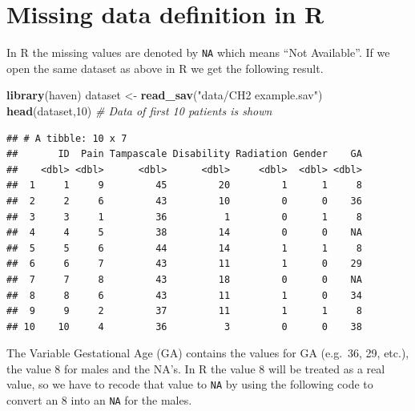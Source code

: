 \documentclass[
]{book}
\newenvironment{Shaded}{\begin{snugshade}}{\end{snugshade}}
\newcommand{\CommentTok}[1]{\textcolor[rgb]{0.56,0.35,0.01}{\textit{#1}}}
\newcommand{\DecValTok}[1]{\textcolor[rgb]{0.00,0.00,0.81}{#1}}
\newcommand{\KeywordTok}[1]{\textcolor[rgb]{0.13,0.29,0.53}{\textbf{#1}}}
\newcommand{\NormalTok}[1]{#1}
\newcommand{\OperatorTok}[1]{\textcolor[rgb]{0.81,0.36,0.00}{\textbf{#1}}}
\newcommand{\OtherTok}[1]{\textcolor[rgb]{0.56,0.35,0.01}{#1}}
\newcommand{\StringTok}[1]{\textcolor[rgb]{0.31,0.60,0.02}{#1}}
\begin{document}
\hypertarget{missing-data-definition-in-r}{%
\section{Missing data definition in
R}\label{missing-data-definition-in-r}}

In R the missing values are denoted by \texttt{NA} which means ``Not
Available''. If we open the same dataset as above in R we get the
following result.

\begin{Shaded}
\begin{Highlighting}[]
\KeywordTok{library}\NormalTok{(haven)}
\NormalTok{dataset <-}\StringTok{ }\KeywordTok{read_sav}\NormalTok{(}\StringTok{"data/CH2 example.sav"}\NormalTok{)}
\KeywordTok{head}\NormalTok{(dataset,}\DecValTok{10}\NormalTok{) }\CommentTok{# Data of first 10 patients is shown}
\end{Highlighting}
\end{Shaded}

\begin{verbatim}
## # A tibble: 10 x 7
##       ID  Pain Tampascale Disability Radiation Gender    GA
##    <dbl> <dbl>      <dbl>      <dbl>     <dbl>  <dbl> <dbl>
##  1     1     9         45         20         1      1     8
##  2     2     6         43         10         0      0    36
##  3     3     1         36          1         0      1     8
##  4     4     5         38         14         0      0    NA
##  5     5     6         44         14         1      1     8
##  6     6     7         43         11         1      0    29
##  7     7     8         43         18         0      0    NA
##  8     8     6         43         11         1      0    34
##  9     9     2         37         11         1      1     8
## 10    10     4         36          3         0      0    38
\end{verbatim}

The Variable Gestational Age (GA) contains the values for GA (e.g.~36,
29, etc.), the value 8 for males and the NA's. In R the value 8 will be
treated as a real value, so we have to recode that value to \texttt{NA}
by using the following code to convert an 8 into an \texttt{NA} for the
males.

\begin{Shaded}
\end{Shaded}
\end{document}
